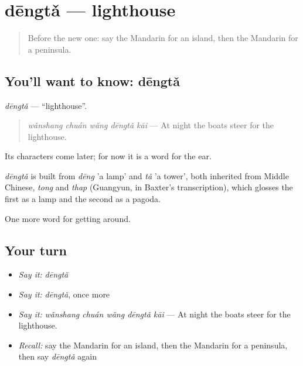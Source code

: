 \section[dēngtǎ]{dēngtǎ — lighthouse}

\label{lesson:ZH-C444-dengta}



\begin{quote}
Before the new one: say the Mandarin for an island, then the Mandarin for a peninsula.
\end{quote}

\subsection*{You'll want to know: dēngtǎ}
\emph{dēngtǎ} — \textquotedblleft{}lighthouse\textquotedblright{}.

\begin{quote}
\emph{wǎnshang chuán wǎng dēngtǎ kāi} — At night the boats steer for the lighthouse.
\end{quote}

Its characters come later; for now it is a word for the ear.

\begin{cousinweb}
\emph{dēngtǎ} is built from \emph{dēng} 'a lamp' and \emph{tǎ} 'a tower', both inherited from Middle Chinese, \emph{tong} and \emph{thap} (Guangyun, in Baxter's transcription), which glosses the first as a lamp and the second as a pagoda.
\end{cousinweb}

\begin{grammarlens}[title={What you've built}]
One more word for getting around.
\end{grammarlens}

\subsection*{Your turn}
\begin{itemize}
\raggedright
  \item \emph{Say it:} \emph{dēngtǎ}
  \item \emph{Say it:} \emph{dēngtǎ}, once more
  \item \emph{Say it:} \emph{wǎnshang chuán wǎng dēngtǎ kāi} — At night the boats steer for the lighthouse.
  \item \emph{Recall:} say the Mandarin for an island, then the Mandarin for a peninsula, then say \emph{dēngtǎ} again
\end{itemize}

